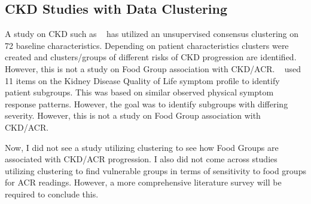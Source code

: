 \subsection{CKD Studies with Data Clustering}
\flushleft \justifying A study on CKD such as ~\cite{Zheng2021} has utilized an unsupervised consensus clustering on 72 baseline characteristics. Depending on patient characteristics clusters were created and clusters/groups of different risks of CKD progression are identified. However, this is not a study on Food Group association with CKD/ACR. ~\cite{LockWood2020} used 11 items on the Kidney Disease Quality of Life symptom profile to identify patient subgroups. This was based on similar observed physical symptom response patterns. However, the goal was to identify subgroups with differing severity. However, this is not a study on Food Group association with CKD/ACR.

\flushleft \justifying Now, I did not see a study utilizing clustering to see how Food Groups are associated with CKD/ACR progression. I also did not come across studies utilizing clustering to find vulnerable groups in terms of sensitivity to food groups for ACR readings. However, a more comprehensive literature survey will be required to conclude this.